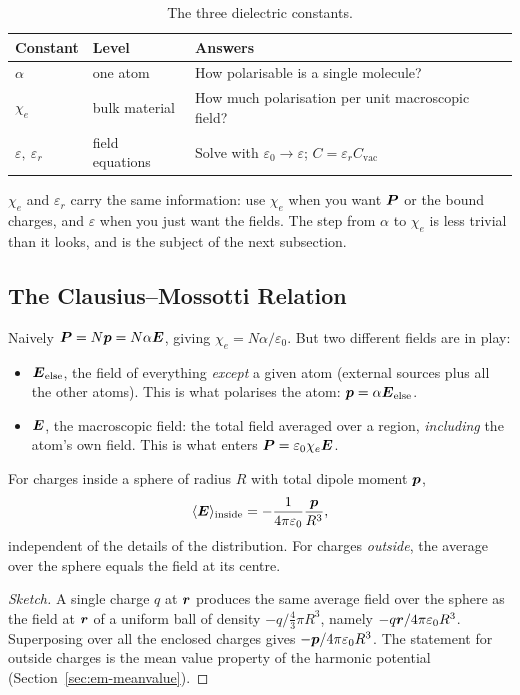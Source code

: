 \begin{table}[ht]
\centering
\renewcommand{\arraystretch}{1.4}
\begin{tabular}{l|l|l}
    Constant & Level & Answers\\\hline
    $\alpha$ & one atom & How polarisable is a single molecule?\\
    $\chi_e$ & bulk material & How much polarisation per unit macroscopic field?\\
    $\varepsilon,\ \varepsilon_r$ & field equations & Solve with $\varepsilon_0\to\varepsilon$; $C = \varepsilon_rC_{\text{vac}}$
\end{tabular}
\caption{The three dielectric constants.}
\end{table}

$\chi_e$ and $\varepsilon_r$ carry the same information: use $\chi_e$ when you want $\vect{P}$ or the bound charges, and $\varepsilon$ when you just want the fields. The step from $\alpha$ to $\chi_e$ is less trivial than it looks, and is the subject of the next subsection.

\subsection{The Clausius--Mossotti Relation}

Naively $\vect{P} = N\lvect{p} = N\alpha\vect{E}$, giving $\chi_e = N\alpha/\varepsilon_0$. But two different fields are in play:
\begin{itemize}
    \item $\vect{E}_{\text{else}}$, the field of everything \emph{except} a given atom (external sources plus all the other atoms). This is what polarises the atom: $\lvect{p} = \alpha\vect{E}_{\text{else}}$.
    \item $\vect{E}$, the macroscopic field: the total field averaged over a region, \emph{including} the atom's own field. This is what enters $\vect{P} = \varepsilon_0\chi_e\vect{E}$.
\end{itemize}

\begin{theorem}
For charges inside a sphere of radius $R$ with total dipole moment $\bm{p}$,
\[
    \langle\vect{E}\rangle_{\text{inside}} = -\frac{1}{4\pi\varepsilon_0}\frac{\lvect{p}}{R^3},
\]
independent of the details of the distribution. For charges \emph{outside}, the average over the sphere equals the field at its centre.
\end{theorem}
\begin{proof}[Sketch]
A single charge $q$ at $\bm{r}$ produces the same average field over the sphere as the field at $\bm{r}$ of a uniform ball of density $-q/\tfrac43\pi R^3$, namely $-q\bm{r}/4\pi\varepsilon_0R^3$. Superposing over all the enclosed charges gives $-\bm{p}/4\pi\varepsilon_0R^3$. The statement for outside charges is the mean value property of the harmonic potential (Section~\ref{sec:em-meanvalue}).
\end{proof}

